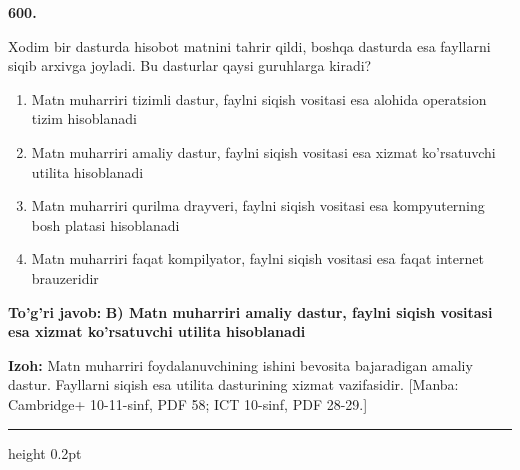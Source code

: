\documentclass[10pt,a4paper]{article}
\begin{document}
{\bfseries\sffamily\color{ink} 600.}
\par
Xodim bir dasturda hisobot matnini tahrir qildi, boshqa dasturda esa fayllarni siqib arxivga joyladi. Bu dasturlar qaysi guruhlarga kiradi?
\begin{enumerate}[label=\Alph*),leftmargin=9mm]
\item Matn muharriri tizimli dastur, faylni siqish vositasi esa alohida operatsion tizim hisoblanadi
\item Matn muharriri amaliy dastur, faylni siqish vositasi esa xizmat ko'rsatuvchi utilita hisoblanadi
\item Matn muharriri qurilma drayveri, faylni siqish vositasi esa kompyuterning bosh platasi hisoblanadi
\item Matn muharriri faqat kompilyator, faylni siqish vositasi esa faqat internet brauzeridir
\end{enumerate}
\begin{tcolorbox}[enhanced,breakable,colback=teal!4,colframe=teal!60!black,boxrule=0.45pt,arc=1.2mm,left=2.7mm,right=2.7mm,top=1.8mm,bottom=1.8mm,before skip=2mm,after skip=2mm]
{\bfseries\sffamily\color{teal}To'g'ri javob:} \textbf{B) Matn muharriri amaliy dastur, faylni siqish vositasi esa xizmat ko'rsatuvchi utilita hisoblanadi}
\par\smallskip
{\bfseries Izoh:} Matn muharriri foydalanuvchining ishini bevosita bajaradigan amaliy dastur. Fayllarni siqish esa utilita dasturining xizmat vazifasidir. [Manba: Cambridge+ 10-11-sinf, PDF 58; ICT 10-sinf, PDF 28-29.]
\end{tcolorbox}
\vspace{2mm}\hrule height 0.2pt\vspace{3mm}
\end{document}
